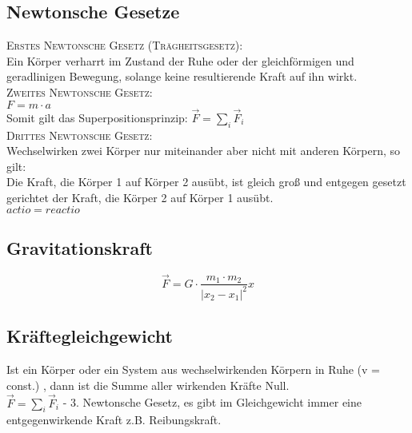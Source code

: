 \documentclass[a4paper,12pt]{report}
\begin{document}
\subsection{Newtonsche Gesetze}

\textsc{Erstes Newtonsche Gesetz (Trägheitsgesetz):} \\

Ein Körper verharrt im Zustand der Ruhe oder der gleichförmigen und geradlinigen Bewegung, solange keine resultierende Kraft auf ihn wirkt.\\

\textsc{Zweites Newtonsche Gesetz:} \\

$ F = m \cdot a $\\

Somit gilt das Superpositionsprinzip: $ \vec{F} = \sum_i{\vec{F}_i} $ \\

\textsc{Drittes Newtonsche Gesetz:} \\

Wechselwirken zwei Körper nur miteinander aber nicht mit anderen Körpern, so gilt: \\
		
Die Kraft, die Körper 1 auf Körper 2 ausübt, ist gleich groß und entgegen gesetzt gerichtet der Kraft, die Körper 2 auf Körper 1 ausübt.\\


$ actio = reactio $ \\

\subsection{Gravitationskraft}

\begin{equation}
\vec{F} = G \cdot \frac{m_1 \cdot m_2}{|x_2 - x_1|^2}\hat{x} 
\end{equation}

\subsection{Kräftegleichgewicht}

Ist ein Körper oder ein System aus wechselwirkenden Körpern in Ruhe (v = const.) , dann ist die Summe aller wirkenden Kräfte Null. \\

$ \vec{F} = \sum_i{\vec{F}_i} $ - 3. Newtonsche Gesetz, es gibt im Gleichgewicht immer eine entgegenwirkende Kraft z.B. Reibungskraft.
\end{document}
